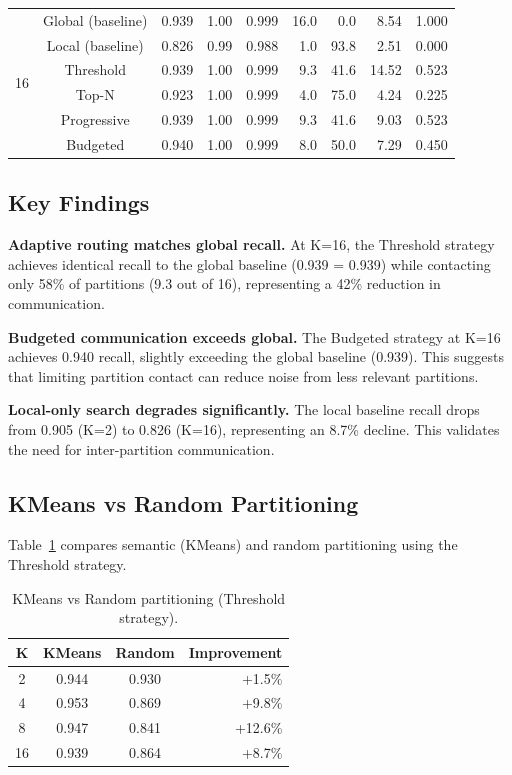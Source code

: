 \documentclass[10pt,twocolumn]{article}
\begin{document}
\begin{table}[t]
{\begin{tabular}{ccrrrrrrr}
\midrule
\multirow{6}{*}{16}
& Global (baseline) & 0.939 & 1.00 & 0.999 & 16.0 & 0.0 & 8.54 & 1.000 \\
& Local (baseline) & 0.826 & 0.99 & 0.988 & 1.0 & 93.8 & 2.51 & 0.000 \\
& Threshold & 0.939 & 1.00 & 0.999 & 9.3 & 41.6 & 14.52 & 0.523 \\
& Top-N & 0.923 & 1.00 & 0.999 & 4.0 & 75.0 & 4.24 & 0.225 \\
& Progressive & 0.939 & 1.00 & 0.999 & 9.3 & 41.6 & 9.03 & 0.523 \\
& Budgeted & 0.940 & 1.00 & 0.999 & 8.0 & 50.0 & 7.29 & 0.450 \\
\bottomrule
\end{tabular}%
}
\end{table}

\subsection{Key Findings}

\textbf{Adaptive routing matches global recall.} At K=16, the Threshold strategy achieves identical recall to the global baseline (0.939 = 0.939) while contacting only 58\% of partitions (9.3 out of 16), representing a 42\% reduction in communication.

\textbf{Budgeted communication exceeds global.} The Budgeted strategy at K=16 achieves 0.940 recall, slightly exceeding the global baseline (0.939). This suggests that limiting partition contact can reduce noise from less relevant partitions.

\textbf{Local-only search degrades significantly.} The local baseline recall drops from 0.905 (K=2) to 0.826 (K=16), representing an 8.7\% decline. This validates the need for inter-partition communication.

\subsection{KMeans vs Random Partitioning}

Table~\ref{tab:kmeans_vs_random} compares semantic (KMeans) and random partitioning using the Threshold strategy.

\begin{table}[h]
\centering
\caption{KMeans vs Random partitioning (Threshold strategy).}
\label{tab:kmeans_vs_random}
\begin{tabular}{cccr}
\toprule
\textbf{K} & \textbf{KMeans} & \textbf{Random} & \textbf{Improvement} \\
\midrule
2 & 0.944 & 0.930 & +1.5\% \\
4 & 0.953 & 0.869 & +9.8\% \\
8 & 0.947 & 0.841 & +12.6\% \\
16 & 0.939 & 0.864 & +8.7\% \\
\bottomrule
\end{tabular}
\end{table}
\end{document}
